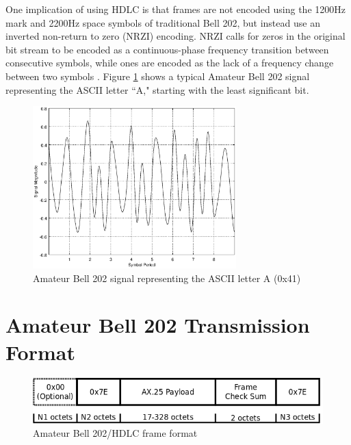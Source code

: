 \documentclass[12pt,letterpaper]{article}
\begin{document}
One implication of using HDLC is that frames are not encoded using the
1200Hz mark and 2200Hz space symbols of traditional Bell 202,
but instead use an
inverted non-return to zero (NRZI) encoding.
NRZI calls for zeros in the original bit stream to be encoded as a
continuous-phase frequency transition between consecutive symbols, 
while ones are encoded as
the lack of a frequency change between two symbols \cite{iso13239}.
Figure \ref{fig:bell202sample} shows a typical Amateur Bell 202
signal representing the ASCII letter ``A," starting with the least significant bit.

\begin{figure}
	\centering
	\includegraphics[width=0.7\textwidth]{src/octave/bell202A}
	\caption{Amateur Bell 202 signal representing the ASCII letter A (0x41)}
	\label{fig:bell202sample}
\end{figure}


\section{Amateur Bell 202 Transmission Format}

\begin{figure}
	\centering
	\includegraphics[width=1.0\textwidth]{src/dia/bell202}
	\caption{Amateur Bell 202/HDLC frame format}
	\label{fig:bell202format}
\end{figure}
\end{document}
